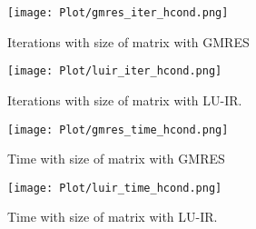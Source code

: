 \begin{figure}[ht]
     \begin{minipage}[b]{0.5\linewidth}
        \centering
   \texttt{[image: Plot/gmres\_iter\_hcond.png]}
        \caption{Iterations with size of matrix with GMRES}
        \label{fig:image15}
    \end{minipage}
    \hspace{0.5cm} 
    \begin{minipage}[b]{0.5\linewidth}
        \centering
        \texttt{[image: Plot/luir\_iter\_hcond.png]}
        \caption{Iterations with size of matrix with LU-IR.}
        \label{fig:image16}
    \end{minipage}
\end{figure}
\newpage
\begin{figure}[ht]
     \begin{minipage}[b]{0.5\linewidth}
        \centering
   \texttt{[image: Plot/gmres\_time\_hcond.png]}
        \caption{Time with size of matrix with GMRES}
        \label{fig:image17}
    \end{minipage}
    \hspace{0.5cm} 
    \begin{minipage}[b]{0.5\linewidth}
        \centering
        \texttt{[image: Plot/luir\_time\_hcond.png]}
        \caption{Time with size of matrix with LU-IR.}
        \label{fig:image18}
    \end{minipage}
\end{figure}
\clearpage



